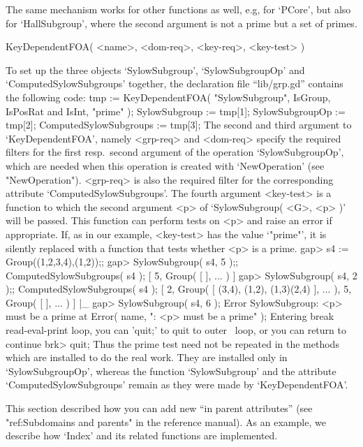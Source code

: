 The same mechanism  works for other functions as  well, e.g, for `PCore',
but also for `HallSubgroup', where the second argument is not a prime but
a set of primes.

\>KeyDependentFOA( <name>, <dom-req>, <key-req>, <key-test> )

To   set up  the   three objects  `SylowSubgroup',  `SylowSubgroupOp' and
`ComputedSylowSubgroups'  together,   the declaration file ``lib/grp.gd''
contains the following code:
\begintt
    tmp := KeyDependentFOA( "SylowSubgroup",
	       IsGroup, IsPosRat and IsInt, "prime" );
    SylowSubgroup          := tmp[1];
    SylowSubgroupOp        := tmp[2];
    ComputedSylowSubgroups := tmp[3];
\endtt
The second and third argument  to `KeyDependentFOA', namely <grp-req> and
<dom-req> specify   the  required filters  for   the first resp.\  second
argument of the operation  `SylowSubgroupOp', which are needed  when this
operation is created with  `NewOperation' (see "NewOperation"). <grp-req>
is   also    the required  filter    for  the   corresponding   attribute
`ComputedSylowSubgroups'. The fourth argument <key-test> is a function to
which  the second  argument <p> of  `SylowSubgroup(  <G>, <p> )' will  be
passed.  This function can  perform tests  on  <p> and  raise an error if
appropriate.  If, as in our example,  <key-test> has the value `"prime"',
it is silently  replaced  with a function that   tests whether  <p> is  a
prime.
\beginexample
    gap> s4 := Group((1,2,3,4),(1,2));;
    gap> SylowSubgroup( s4, 5 );;  ComputedSylowSubgroups( s4 );
    [ 5, Group( [  ], ... ) ]
    gap> SylowSubgroup( s4, 2 );;  ComputedSylowSubgroups( s4 );
    [ 2, Group( [ (3,4), (1,2), (1,3)(2,4) ], ... ), 5,
      Group( [  ], ... ) ]
|_
    gap> SylowSubgroup( s4, 6 );                                
    Error SylowSubgroup: <p> must be a prime at
    Error( name, ": <p> must be a prime" );
    Entering break read-eval-print loop, you can 'quit;' to quit to outer \
    loop,
    or you can return to continue
    brk> quit;
\endexample
Thus   the prime test need not    be repeated in  the   methods which are
installed  to  do   the   real  work.  They    are  installed  only    in
`SylowSubgroupOp', whereas the function `SylowSubgroup' and the attribute
`ComputedSylowSubgroups' remain as they were made by `KeyDependentFOA'.

\Section{In parent attributes}

This section described how you can add  new ``in parent attributes'' (see
"ref:Subdomains and parents" in the reference manual).  As an example, we
describe how `Index' and its related functions are implemented.


